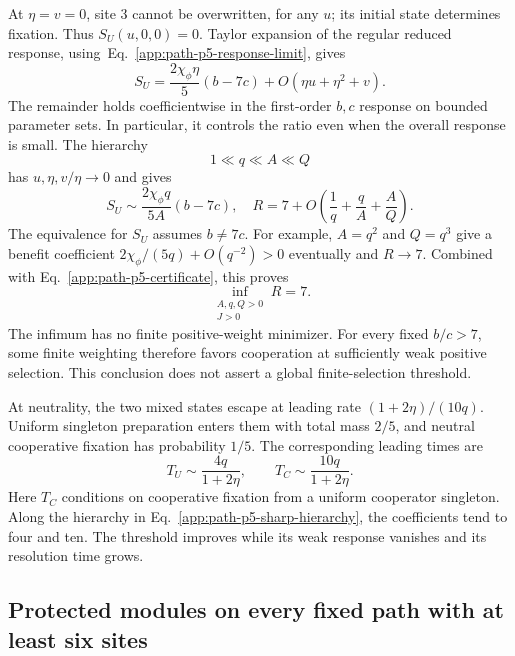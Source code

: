 \documentclass[aps,pre,reprint,amsmath,amssymb,longbibliography]{revtex4-2}
\begin{document}
At $\eta=v=0$, site 3 cannot be overwritten, for any $u$; its initial
state determines fixation. Thus $S_U(u,0,0)=0$. Taylor expansion of the
regular reduced response, using~Eq.~\eqref{app:path-p5-response-limit}, gives
\begin{equation}
 S_U=\frac{2\chi_\phi\eta}{5}(b-7c)
       +O(\eta u+\eta^2+v).
 \label{app:path-p5-uniform-response}
\end{equation}
The remainder holds coefficientwise in the first-order $b,c$ response
on bounded parameter sets. In particular, it controls the ratio even
when the overall response is small.
The hierarchy
\begin{equation}
 1\ll q\ll A\ll Q
 \label{app:path-p5-sharp-hierarchy}
\end{equation}
has $u,\eta,v/\eta\to0$ and gives
\begin{equation}
 S_U\sim\frac{2\chi_\phi q}{5A}(b-7c),\quad
 R=7+O\!\left(\frac1q+\frac qA+\frac AQ\right).
 \label{app:path-p5-sharp-limit}
\end{equation}
The equivalence for $S_U$ assumes $b\ne7c$. For example, $A=q^2$ and
$Q=q^3$ give a benefit coefficient
$2\chi_\phi/(5q)+O(q^{-2})>0$ eventually and $R\to7$. Combined with
Eq.~\eqref{app:path-p5-certificate}, this proves
\begin{equation}
 \inf_{\substack{A,q,Q>0\\J>0}} R=7.
 \label{app:path-p5-infimum}
\end{equation}
The infimum has no finite positive-weight minimizer.
For every fixed $b/c>7$, some finite weighting therefore favors
cooperation at sufficiently weak positive selection. This conclusion
does not assert a global finite-selection threshold.

At neutrality, the two mixed states escape at leading rate
$(1+2\eta)/(10q)$. Uniform singleton preparation enters them with total
mass $2/5$, and neutral cooperative fixation has probability $1/5$.
The corresponding leading times are
\begin{equation}
 T_U\sim\frac{4q}{1+2\eta},\qquad
 T_C\sim\frac{10q}{1+2\eta}.
 \label{app:path-p5-times}
\end{equation}
Here $T_C$ conditions on cooperative fixation from a uniform
cooperator singleton. Along the hierarchy in Eq.~\eqref{app:path-p5-sharp-hierarchy}, the
coefficients tend to four and ten. The threshold improves while its
weak response vanishes and its resolution time grows.

\subsection{Protected modules on every fixed path with at least six sites}
\label{app:path-general-construction}\label{app:path-long}
\end{document}
